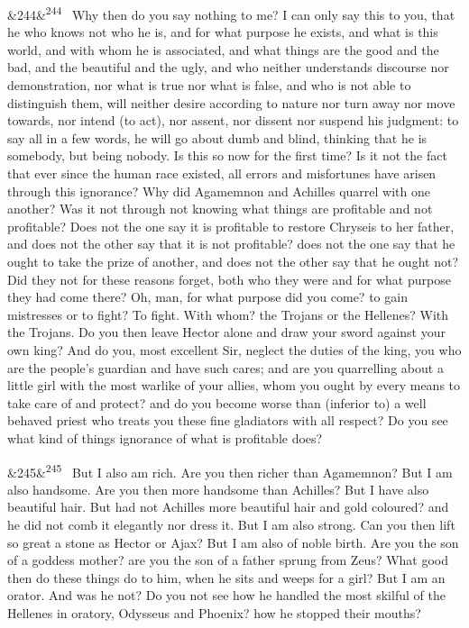 \documentclass[12pt]{article}
\newcommand{\para}[1][]{\par\noindent\ifx&#1&\else\textsuperscript{\footnotesize #1}~\fi}
\begin{document}
\para[244] Why then do you say nothing to me? I can only say this to you, that he who knows not who he is, and for what purpose he exists, and what is this world, and with whom he is associated, and what things are the good and the bad, and the beautiful and the ugly, and who neither understands discourse nor demonstration, nor what is true nor what is false, and who is not able to distinguish them, will neither desire according to nature nor turn away nor move towards, nor intend (to act), nor assent, nor dissent nor suspend his judgment: to say all in a few words, he will go about dumb and blind, thinking that he is somebody, but being nobody. Is this so now for the first time? Is it not the fact that ever since the human race existed, all errors and misfortunes have arisen through this ignorance? Why did Agamemnon and Achilles quarrel with one another? Was it not through not knowing what things are profitable and not profitable? Does not the one say it is profitable to restore Chryseis to her father, and does not the other say that it is not profitable? does not the one say that he ought to take the prize of another, and does not the other say that he ought not? Did they not for these reasons forget, both who they were and for what purpose they had come there? Oh, man, for what purpose did you come? to gain mistresses or to fight? To fight. With whom? the Trojans or the Hellenes? With the Trojans. Do you then leave Hector alone and draw your sword against your own king? And do you, most excellent Sir, neglect the duties of the king, you who are the people's guardian and have such cares; and are you quarrelling about a little girl with the most warlike of your allies, whom you ought by every means to take care of and protect? and do you become worse than (inferior to) a well behaved priest who treats you these fine gladiators with all respect? Do you see what kind of things ignorance of what is profitable does?

\para[245] But I also am rich. Are you then richer than Agamemnon? But I am also handsome. Are you then more handsome than Achilles? But I have also beautiful hair. But had not Achilles more beautiful hair and gold coloured? and he did not comb it elegantly nor dress it. But I am also strong. Can you then lift so great a stone as Hector or Ajax? But I am also of noble birth. Are you the son of a goddess mother? are you the son of a father sprung from Zeus? What good then do these things do to him, when he sits and weeps for a girl? But I am an orator. And was he not? Do you not see how he handled the most skilful of the Hellenes in oratory, Odysseus and Phoenix? how he stopped their mouths?
\end{document}
